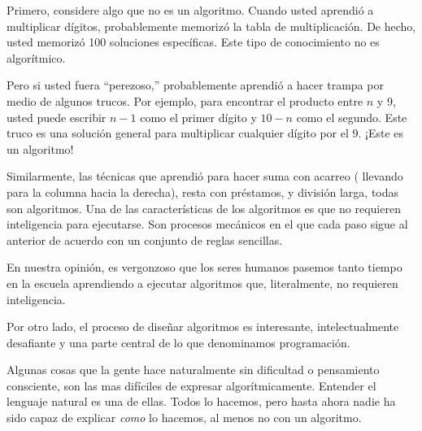 Primero, considere algo que no es un algoritmo. Cuando usted aprendió
a multiplicar dígitos, probablemente memorizó la tabla de multiplicación.
De hecho, usted memorizó 100 soluciones específicas. Este tipo de
conocimiento no es algorítmico.

Pero si usted fuera ``perezoso,'' probablemente aprendió a hacer
trampa por medio de algunos trucos. Por ejemplo, para encontrar el
producto entre $n$ y 9, usted puede escribir $n-1$ como el primer
dígito y $10-n$ como el segundo. Este truco es una solución general
para multiplicar cualquier dígito por el 9. ¡Este es un algoritmo!

Similarmente, las técnicas que aprendió para hacer suma con acarreo
( llevando para la columna hacia la derecha), resta con préstamos,
y división larga, todas son algoritmos. Una de las características
de los algoritmos es que no requieren inteligencia para ejecutarse.
Son procesos mecánicos en el que cada paso sigue al anterior de acuerdo
con un conjunto de reglas sencillas.

En nuestra opinión, es vergonzoso que los seres humanos pasemos tanto
tiempo en la escuela aprendiendo a ejecutar algoritmos que, literalmente,
no requieren inteligencia.

Por otro lado, el proceso de diseñar algoritmos es interesante, intelectualmente
desafiante y una parte central de lo que denominamos programación.

Algunas cosas que la gente hace naturalmente sin dificultad o pensamiento
consciente, son las mas difíciles de expresar algorítmicamente. Entender
el lenguaje natural es una de ellas. Todos lo hacemos, pero hasta
ahora nadie ha sido capaz de explicar {\em como} lo hacemos, al
menos no con un algoritmo.

